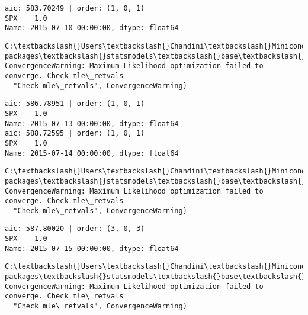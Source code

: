 \documentclass[11pt]{article}
\begin{document}
    \begin{Verbatim}[commandchars=\\\{\}]
aic: 583.70249 | order: (1, 0, 1)
SPX    1.0
Name: 2015-07-10 00:00:00, dtype: float64

    \end{Verbatim}

    \begin{Verbatim}[commandchars=\\\{\}]
C:\textbackslash{}Users\textbackslash{}Chandini\textbackslash{}Miniconda3\textbackslash{}envs\textbackslash{}auquan\textbackslash{}lib\textbackslash{}site-packages\textbackslash{}statsmodels\textbackslash{}base\textbackslash{}model.py:496: ConvergenceWarning: Maximum Likelihood optimization failed to converge. Check mle\_retvals
  "Check mle\_retvals", ConvergenceWarning)

    \end{Verbatim}

    \begin{Verbatim}[commandchars=\\\{\}]
aic: 586.78951 | order: (1, 0, 1)
SPX    1.0
Name: 2015-07-13 00:00:00, dtype: float64
aic: 588.72595 | order: (1, 0, 1)
SPX    1.0
Name: 2015-07-14 00:00:00, dtype: float64

    \end{Verbatim}

    \begin{Verbatim}[commandchars=\\\{\}]
C:\textbackslash{}Users\textbackslash{}Chandini\textbackslash{}Miniconda3\textbackslash{}envs\textbackslash{}auquan\textbackslash{}lib\textbackslash{}site-packages\textbackslash{}statsmodels\textbackslash{}base\textbackslash{}model.py:496: ConvergenceWarning: Maximum Likelihood optimization failed to converge. Check mle\_retvals
  "Check mle\_retvals", ConvergenceWarning)

    \end{Verbatim}

    \begin{Verbatim}[commandchars=\\\{\}]
aic: 587.80020 | order: (3, 0, 3)
SPX    1.0
Name: 2015-07-15 00:00:00, dtype: float64

    \end{Verbatim}

    \begin{Verbatim}[commandchars=\\\{\}]
C:\textbackslash{}Users\textbackslash{}Chandini\textbackslash{}Miniconda3\textbackslash{}envs\textbackslash{}auquan\textbackslash{}lib\textbackslash{}site-packages\textbackslash{}statsmodels\textbackslash{}base\textbackslash{}model.py:496: ConvergenceWarning: Maximum Likelihood optimization failed to converge. Check mle\_retvals
  "Check mle\_retvals", ConvergenceWarning)

    \end{Verbatim}
\end{document}
